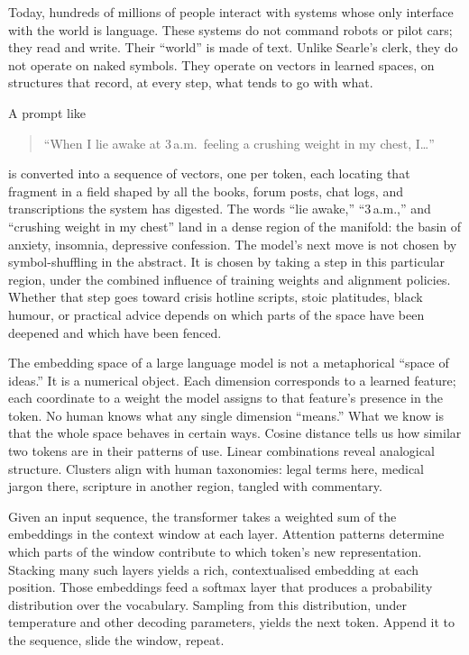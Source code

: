 \documentclass[12pt,a4paper]{article}
\begin{document}
Today, hundreds of millions of people interact with systems whose only interface with the world is language. These systems do not command robots or pilot cars; they read and write. Their ``world'' is made of text. Unlike Searle's clerk, they do not operate on naked symbols. They operate on vectors in learned spaces, on structures that record, at every step, what tends to go with what.

A prompt like
\begin{quote}
``When I lie awake at 3\,a.m.\ feeling a crushing weight in my chest, I\ldots''
\end{quote}
is converted into a sequence of vectors, one per token, each locating that fragment in a field shaped by all the books, forum posts, chat logs, and transcriptions the system has digested. The words ``lie awake,'' ``3\,a.m.,'' and ``crushing weight in my chest'' land in a dense region of the manifold: the basin of anxiety, insomnia, depressive confession. The model's next move is not chosen by symbol-shuffling in the abstract. It is chosen by taking a step in this particular region, under the combined influence of training weights and alignment policies. Whether that step goes toward crisis hotline scripts, stoic platitudes, black humour, or practical advice depends on which parts of the space have been deepened and which have been fenced.

The embedding space of a large language model is not a metaphorical ``space of ideas.'' It is a numerical object. Each dimension corresponds to a learned feature; each coordinate to a weight the model assigns to that feature's presence in the token. No human knows what any single dimension ``means.'' What we know is that the whole space behaves in certain ways. Cosine distance tells us how similar two tokens are in their patterns of use. Linear combinations reveal analogical structure. Clusters align with human taxonomies: legal terms here, medical jargon there, scripture in another region, tangled with commentary.

Given an input sequence, the transformer takes a weighted sum of the embeddings in the context window at each layer. Attention patterns determine which parts of the window contribute to which token's new representation. Stacking many such layers yields a rich, contextualised embedding at each position. Those embeddings feed a softmax layer that produces a probability distribution over the vocabulary. Sampling from this distribution, under temperature and other decoding parameters, yields the next token. Append it to the sequence, slide the window, repeat.
\end{document}

